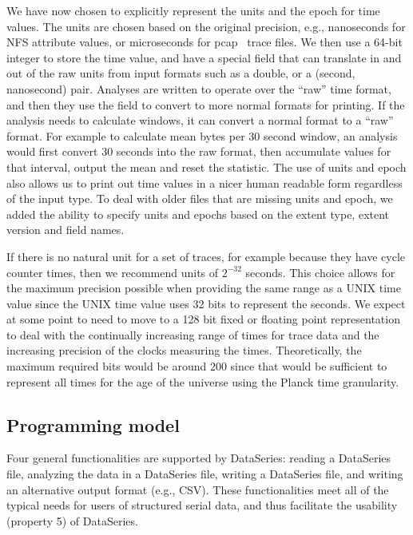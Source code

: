 \documentclass{acm_proc_article-sp}
\begin{document}
We have now chosen to explicitly represent the units and the epoch for
time values.  The units are chosen based on the original precision,
e.g., nanoseconds for NFS attribute values, or microseconds for pcap~\cite{libpcap}
trace files.  We then use a 64-bit integer to store the time value,
and have a special field that can translate in and out of the raw
units from input formats such as a double, or a (second, nanosecond)
pair.  Analyses are written to operate over the ``raw'' time format,
and then they use the field to convert to more normal formats for
printing.  If the analysis needs to calculate windows, it can convert
a normal format to a ``raw'' format.  For example to calculate mean
bytes per 30 second window, an analysis would first convert 30 seconds
into the raw format, then accumulate values for that
interval, output the mean and reset the statistic.  The use of units
and epoch also allows us to print out time values in a nicer human
readable form regardless of the input type.  To deal with older files
that are missing units and epoch, we added the ability to specify
units and epochs based on the extent type, extent version and field
names.

If there is no natural unit for a set of traces, for example because
they have cycle counter times, then we recommend units of $2^{-32}$
seconds.  This choice allows for the maximum precision possible when
providing the same range as a UNIX time value since the UNIX time value
uses 32 bits to represent the seconds.  We expect at some point to
need to move to a 128 bit fixed or floating point representation to
deal with the continually increasing range of times for trace data and
the increasing precision of the clocks measuring the times.  Theoretically,
the maximum required bits would be around 200 since that would be
sufficient to represent all times for the age of the universe
using the Planck time granularity.


\subsection{Programming model}

Four general functionalities are supported by DataSeries:
reading a DataSeries file, 
analyzing the data in a DataSeries file,
writing a DataSeries file,
and writing an alternative output format (e.g., CSV).
These functionalities meet all of the typical needs for
users of structured serial data, and thus facilitate
the usability (property 5) of DataSeries.
\end{document}
